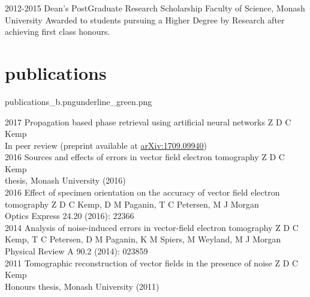 \documentclass[a4paper]{friggeri-cv} %
\newcommand{\spacer}{\vspace{0.0cm}}
\begin{document}
\begin{entrylist}


\entry
{2012-2015\phantom{XXX}}
{Dean's PostGraduate Research Scholarship}
{Faculty of Science, Monash University}
{Awarded to students pursuing a Higher Degree by Research after achieving first class honours.}


\end{entrylist}


\newpage
{}

\spacer
\section{publications}{publications_b.png}{underline_green.png}
\begin{entrylist}
\entry
{2017}
{Propagation based phase retrieval using artificial neural networks}
{}
{Z D C Kemp\\ In peer review (preprint available at \href{https://arxiv.org/abs/1709.09940}{arXiv:1709.09940})\\}
\entry
{2016}
{Sources and effects of errors in vector field electron tomography}
{}
{Z D C Kemp\\ \phd{} thesis, Monash University (2016)\\}
\entry
{2016}
{Effect of specimen orientation on the accuracy of vector field electron tomography}
{}
{Z D C Kemp, D M Paganin, T C Petersen, M J Morgan\\Optics Express 24.20 (2016): 22366\\}
\entry
{2014}
{Analysis of noise-induced errors in vector-field electron tomography}
{}
{Z D C Kemp, T C Petersen, D M Paganin, K M Spiers, M Weyland, M J Morgan\\Physical Review A 90.2 (2014): 023859\\}
\entry
{2011}
{Tomographic reconstruction of vector fields in the presence of noise}
{}
{Z D C Kemp\\ Honours thesis, Monash University (2011)\\}
\end{entrylist}
\end{document}
